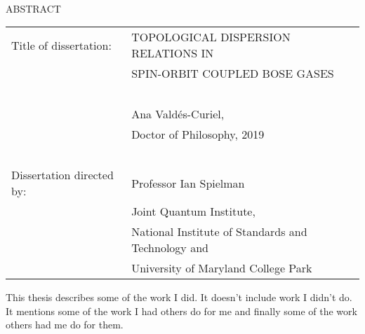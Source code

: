 
\hbox{\ }

\renewcommand{\baselinestretch}{1}
\small \normalsize

\begin{center}
\large{{ABSTRACT}} 

\vspace{3em} 

\end{center}
\hspace{-.15in}
\begin{tabular}{ll}
Title of dissertation:   
&				      {\large  TOPOLOGICAL DISPERSION RELATIONS IN } \\
&				      {\large  SPIN-ORBIT COUPLED BOSE GASES} \\
\ \\
&                     {\large  Ana Valdés-Curiel,} \\
&					  {\large  Doctor of Philosophy, 2019} \\
\ \\
Dissertation directed by: & {\large  Professor Ian Spielman} \\
&  							{\small	 Joint Quantum Institute,} \\
&  							{\small	 National Institute of Standards and Technology and} \\
&  							{\small	 University of Maryland College Park} \\
\end{tabular}

\vspace{3em}

\renewcommand{\baselinestretch}{2}
\large \normalsize

This thesis describes some of the work I did. It doesn't include work I didn't do. It mentions some of the work I had others do for me and finally some of the work others had me do for them.


